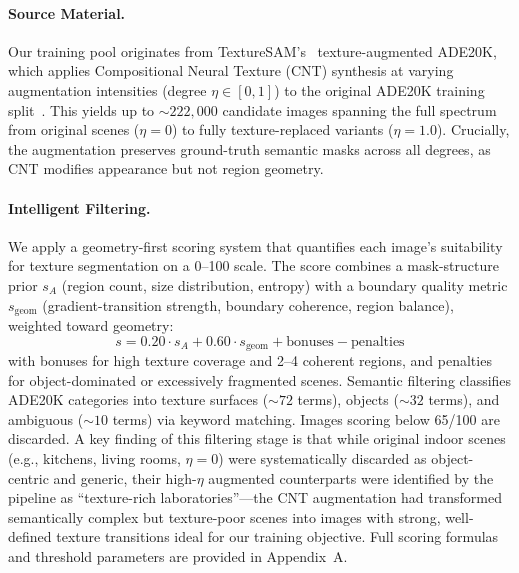 \documentclass{article}
\begin{document}
\paragraph{Source Material.}
Our training pool originates from TextureSAM's~\cite{texturesam} texture-augmented ADE20K, which applies Compositional Neural Texture (CNT) synthesis at varying augmentation intensities (degree $\eta \in [0, 1]$) to the original ADE20K training split~\cite{ade20k}. This yields up to ${\sim}222{,}000$ candidate images spanning the full spectrum from original scenes ($\eta = 0$) to fully texture-replaced variants ($\eta = 1.0$). Crucially, the augmentation preserves ground-truth semantic masks across all degrees, as CNT modifies appearance but not region geometry.

\paragraph{Intelligent Filtering.}
We apply a geometry-first scoring system that quantifies each image's suitability for texture segmentation on a 0--100 scale. The score combines a mask-structure prior $s_A$ (region count, size distribution, entropy) with a boundary quality metric $s_{\text{geom}}$ (gradient-transition strength, boundary coherence, region balance), weighted toward geometry:
\begin{equation}
    s = 0.20 \cdot s_A + 0.60 \cdot s_{\text{geom}} + \text{bonuses} - \text{penalties}
\end{equation}
with bonuses for high texture coverage and 2--4 coherent regions, and penalties for object-dominated or excessively fragmented scenes. Semantic filtering classifies ADE20K categories into texture surfaces (${\sim}72$ terms), objects (${\sim}32$ terms), and ambiguous (${\sim}10$ terms) via keyword matching. Images scoring below 65/100 are discarded. A key finding of this filtering stage is that while original indoor scenes (e.g., kitchens, living rooms, $\eta = 0$) were systematically discarded as object-centric and generic, their high-$\eta$ augmented counterparts were identified by the pipeline as ``texture-rich laboratories''---the CNT augmentation had transformed semantically complex but texture-poor scenes into images with strong, well-defined texture transitions ideal for our training objective. Full scoring formulas and threshold parameters are provided in Appendix~A.
\end{document}
